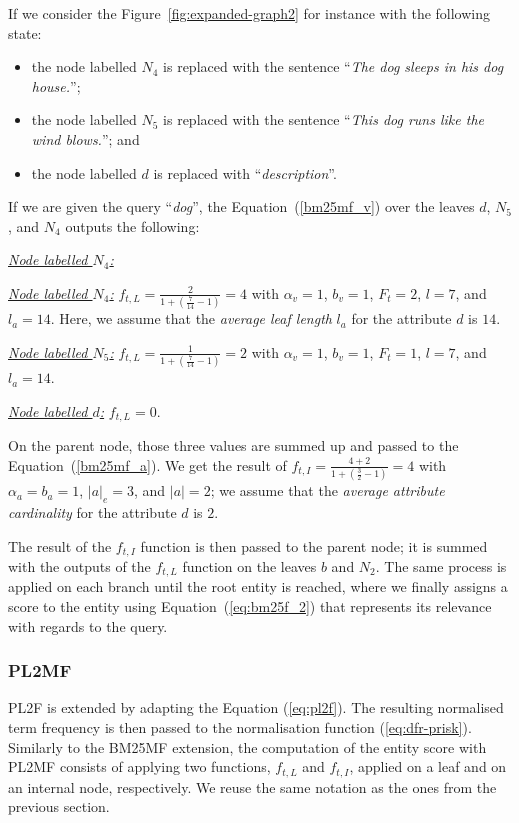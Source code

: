 If we consider the Figure~\ref{fig:expanded-graph2} for instance with the following state:
\begin{itemize}
	\item the node labelled $N_4$ is replaced with the sentence ``\textit{The dog sleeps in his dog house.}'';
	\item the node labelled $N_5$ is replaced with the sentence ``\textit{This dog runs like the wind blows.}''; and
	\item the node labelled $d$ is replaced with ``\textit{description}''.
\end{itemize}
If we are given the query ``\textit{dog}'', the Equation~(\ref{bm25mf_v}) over the leaves $d$, $N_5$, and $N_4$ outputs the following:
\begin{labeling}{\textit{\underline{Node labelled $N_4$:}}}
	\item[\textit{\underline{Node labelled $N_4$:}}] $f_{t,L} = \frac{2}{1 + (\frac{7}{14} - 1)} = 4$ with $\alpha_v=1$, $b_v=1$, $F_t=2$, $l=7$, and $l_a=14$. Here, we assume that the \emph{average leaf length} $l_a$ for the attribute $d$ is $14$.
	\item[\textit{\underline{Node labelled $N_5$:}}] $f_{t,L} = \frac{1}{1 + (\frac{7}{14} - 1)} = 2$ with $\alpha_v=1$, $b_v=1$, $F_t=1$, $l=7$, and $l_a=14$.
	\item[\textit{\underline{Node labelled $d$:}}] $f_{t,L} = 0$.
\end{labeling}
On the parent node, those three values are summed up and passed to the Equation~(\ref{bm25mf_a}). We get the result of $f_{t,I} = \frac{4 + 2}{1 + (\frac{3}{2} - 1)} = 4$ with $\alpha_a=b_a=1$, $\left|{a}\right|_e=3$, and $\left|{a}\right| = 2$; we assume that the \emph{average attribute cardinality} for the attribute $d$ is $2$.

The result of the $f_{t,I}$ function is then passed to the parent node; it is summed with the outputs of the $f_{t,L}$ function on the leaves $b$ and $N_2$. The same process is applied on each branch until the root entity is reached, where we finally assigns a score to the entity using Equation~(\ref{eq:bm25f_2}) that represents its relevance with regards to the query.

\subsubsection{PL2MF}
\label{sec:pl2mf-function}

PL2F is extended by adapting the Equation (\ref{eq:pl2f}). The resulting normalised term frequency is then passed to the normalisation function (\ref{eq:dfr-prisk}).
Similarly to the BM25MF extension, the computation of the entity score with PL2MF consists of applying two functions, $f_{t,L}$ and $f_{t,I}$, applied on a leaf and on an internal node, respectively. We reuse the same notation as the ones from the previous section.\\ 

